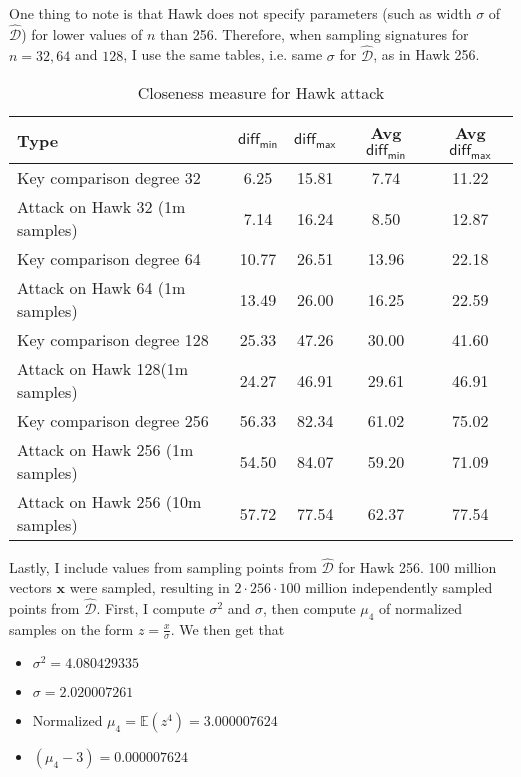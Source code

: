 \documentclass[12 pt]{article}        	%
\renewcommand{\vec}[1]{\mathbf{#1}}
\newcommand{\bb}[1]{\mathbb{#1}}
\newcommand{\dgdi}{\widehat{\mathcal{D}}}
\begin{document}
One thing to note is that Hawk does not specify parameters (such as width $\sigma$ of $\dgdi$) for lower values of $n$ than 256. Therefore, when sampling signatures for $n=32, 64$ and $128$, I use the same tables, i.e. same $\sigma$ for $\dgdi$, as in Hawk 256.

\begin{table}[H]
    \centering
    \caption{Closeness measure for Hawk attack}
    \begin{tabular}{lcccc}
        \toprule
        \textbf{Type} & $\mathsf{diff_{min}}$ & $\mathsf{diff_{max}}$ & \textbf{Avg $\mathsf{diff_{min}}$} & \textbf{Avg $\mathsf{diff_{max}}$} \\
        \midrule
        Key comparison degree 32 & 6.25 & 15.81 & 7.74 & 11.22 \\
        Attack on Hawk 32 (1m samples) & 7.14 & 16.24 & 8.50 & 12.87 \\
        \midrule
        Key comparison degree 64 & 10.77 & 26.51 & 13.96 & 22.18 \\
        Attack on Hawk 64 (1m samples) & 13.49 & 26.00 & 16.25 & 22.59 \\
        \midrule
        Key comparison degree 128 & 25.33 & 47.26 & 30.00 & 41.60 \\
        Attack on Hawk 128(1m samples) & 24.27 & 46.91 & 29.61 & 46.91 \\
        \midrule

        Key comparison degree 256 & 56.33 & 82.34 & 61.02 & 75.02 \\
        Attack on Hawk 256 (1m samples) & 54.50 & 84.07 & 59.20 & 71.09 \\ 
        Attack on Hawk 256 (10m samples) & 57.72 & 77.54 & 62.37 & 77.54 \\
        \bottomrule
    \end{tabular}
\end{table}
Lastly, I include values from sampling points from $\dgdi$ for Hawk 256. 100 million vectors $\vec{x}$ were sampled, resulting in $2 \cdot 256 \cdot 100$ million independently sampled points from $\dgdi$.
First, I compute $\sigma^2$ and $\sigma$, then compute $\mu_4$ of normalized samples on the form $z = \frac{x}{\sigma}$.
We then get that 
\begin{itemize}
    \item $\sigma^2 = 4.080429335$
    \item $\sigma = 2.020007261$
    \item Normalized $\mu_4 = \bb{E} (z^4) = 3.000007624$
    \item $(\mu_4 - 3) = 0.000007624$
\end{itemize}
\end{document}
